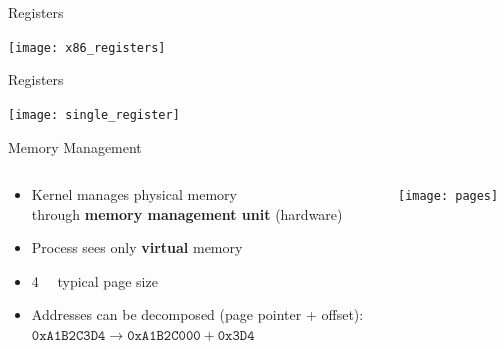 \documentclass[beamer]{uibk}
\begin{document}
\begin{frame}{Registers}
    \begin{center}
        \texttt{[image: x86\_registers]}
    \end{center}
\end{frame}

\begin{frame}{Registers}
    \begin{center}
        \texttt{[image: single\_register]}
    \end{center}
\end{frame}

\begin{frame}{Memory Management}
    \begin{columns}
        \begin{column}{0.5\textwidth}
            \begin{itemize}
                \item Kernel manages physical memory\\
                    through \textbf{memory management unit} (hardware)
                \medskip
                \item Process sees only \textbf{virtual} memory
                \medskip
                \item \SI{4}{\kibi\byte} typical page size
                \medskip
                \item Addresses can be decomposed (page pointer + offset):\\
                    \smallskip
                    $\mathtt{0xA1B2C3D4} \to \texttt{0xA1B2C000} + \mathtt{0x3D4}$
            \end{itemize}
        \end{column}
        \begin{column}{0.5\textwidth}
            \texttt{[image: pages]}
        \end{column}
    \end{columns}
\end{frame}
\end{document}
